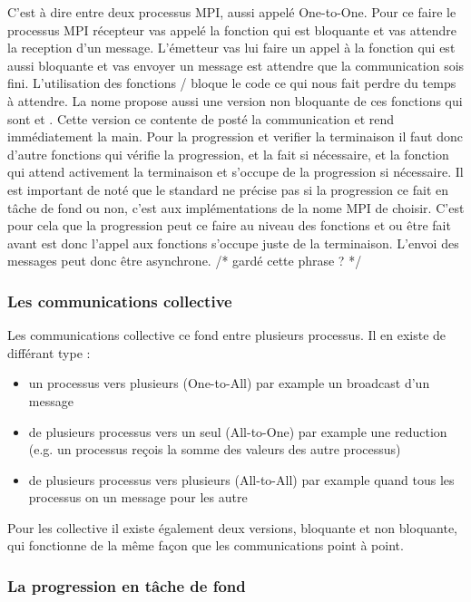 C'est à dire entre deux processus MPI, aussi appelé One-to-One.
Pour ce faire le processus MPI récepteur vas appelé la fonction  qui est bloquante et vas attendre la reception d'un message.
L'émetteur vas lui faire un appel à la fonction  qui est aussi bloquante et vas envoyer un message est attendre que la communication sois fini.
L'utilisation des fonctions  /  bloque le code ce qui nous fait perdre du temps à attendre.
La nome propose aussi une version non bloquante de ces fonctions qui sont  et .
Cette version ce contente de posté la communication et rend immédiatement la main.
Pour la progression et verifier la terminaison il faut donc d'autre fonctions  qui vérifie la progression, et la fait si nécessaire, et la fonction  qui attend activement la terminaison et s'occupe de la progression si nécessaire.
Il est important de noté que le standard ne précise pas si la progression ce fait en tâche de fond ou non, c'est aux implémentations de la nome MPI de choisir.
C'est pour cela que la progression peut ce faire au niveau des fonctions  et  ou être fait avant est donc l'appel aux fonctions s'occupe juste de la terminaison.
L'envoi des messages peut donc être asynchrone. /* gardé cette phrase ? */

\subsubsection{Les communications collective}

Les communications collective ce fond entre plusieurs processus.
Il en existe de différant type :
\begin{itemize}
  \item un processus vers plusieurs (One-to-All) par example un broadcast d'un message
  \item de plusieurs processus vers un seul (All-to-One) par example une reduction (e.g. un processus reçois la somme des valeurs des autre processus)
  \item de plusieurs processus vers plusieurs (All-to-All) par example quand tous les processus on un message pour les autre
\end{itemize}
Pour les collective il existe également deux versions, bloquante et non bloquante, qui fonctionne de la même façon que les communications point à point.

\subsubsection{La progression en tâche de fond}

